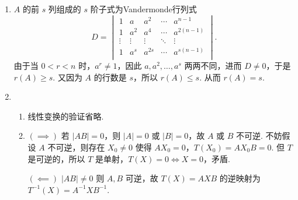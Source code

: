 \begin{enumerate}
    \item $A$ 的前 $s$ 列组成的 $s$ 阶子式为Vandermonde行列式
          \[D = \begin{vmatrix}
                  1      & a      & a^2    & \cdots & a^{n-1}    \\
                  1      & a^2    & a^4    & \cdots & a^{2(n-1)} \\
                  \vdots & \vdots & \vdots & \ddots & \vdots     \\
                  1      & a^s    & a^{2s} & \cdots & a^{s(n-1)} \\
              \end{vmatrix}.\]
          由于当 $0 < r < n$ 时，$a^r \neq 1$，因此 $a, a^2, \ldots, a^s$ 两两不同，进而 $D \neq 0$，于是 $r(A) \geqslant s$. 又因为 $A$ 的行数是 $s$，所以 $r(A) \leqslant s$. 从而 $r(A) = s$.

    \item \begin{enumerate}
              \item 线性变换的验证省略.

              \item $(\implies)$ 若 $\lvert AB \rvert = 0$，则 $\lvert A \rvert = 0$ 或 $\lvert B \rvert = 0$，故 $A$ 或 $B$ 不可逆. 不妨假设 $A$ 不可逆，则存在 $X_0 \neq 0$ 使得 $AX_0 = 0$，$T(X_0) = AX_0B = 0$. 但 $T$ 是可逆的，所以 $T$ 是单射，$T(X) = 0 \Leftrightarrow X = 0$，矛盾.

                    $(\impliedby)$ $\lvert AB \rvert \neq 0$ 则 $A, B$ 可逆，故 $T(X) = AXB$ 的逆映射为 $T^{-1}(X) = A^{-1}XB^{-1}$.
          \end{enumerate}


\end{enumerate}
